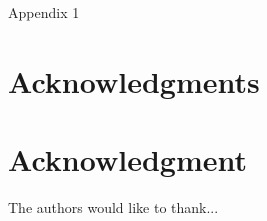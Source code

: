 \documentclass[9pt,journal,compsoc]{IEEEtran}
\begin{document}
%


\appendices

\section{}
Appendix 1


\ifCLASSOPTIONcompsoc
  \section*{Acknowledgments}
\else
  \section*{Acknowledgment}
\fi


The authors would like to thank...


\ifCLASSOPTIONcaptionsoff
  \newpage
\fi




\end{document}
